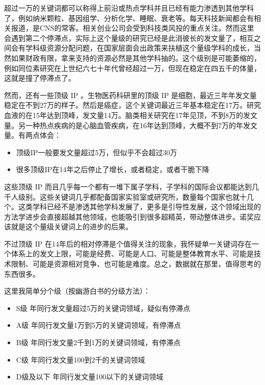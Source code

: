 \documentclass[]{tufte-book}
\providecommand{\tightlist}{%
  \setlength{\itemsep}{0pt}\setlength{\parskip}{0pt}}
\begin{document}
超过一万的关键词都可以称得上前沿或热点学科并且已经有能力渗透到其他学科了，例如纳米颗粒、基因组学、分析化学、睡眠、衰老等。每天科技新闻都会有相关报道，是CNS的常客。相关创业公司会受到科技类风投的重点关注。然而这里会遇到第二个停滞点，实际上这个量级的研究已经是此消彼长的发文量了，相互之间会有学科级资源分配问题，在国家层面会出政策来扶植这个量级学科的成长，当然如果财政有限，拿来支持的资源必然是其他学科抽的。这个级别是可能萎缩的，例如同位素研究在上世纪六七十年代曾经超过一万，但现在稳定在四五千的体量，这就是撞了停滞点了。

然而，还有一些顶级 IP 。生物医药科研里的顶级 IP 是细胞，最近三年年发文量稳定在不到27万的样子。然后是癌症，这个关键词最近三年基本稳定在17万。研究血液的在15年达到顶峰，发文量14万。脑类相关研究在17年见顶，不到8万的发文量。另一种热点疾病的是心脑血管疾病，在16年达到顶峰，大概不到7万的年发文量。有两点体会：

\begin{itemize}
\tightlist
\item
  顶级IP一般要发文量超过5万，但似乎不会超过30万
\item
  很多顶级IP在14年之后停止了增长，或者稳定，或者干脆下降
\end{itemize}

这些顶级 IP 而且几乎每一个都有一堆下属子学科，子学科的国际会议都能达到几千人级别。这些关键词几乎都配备国家实验室或研究所，数量每个国家也就十几个。这类学科已经不是渗透其他学科发展了，更多是引导性发展，这个领域出现的方法学进步会直接超越其他领域，也能吸引到很多超精英，带动整体进步。诺奖应该就是这个量级关键词上的进步的后果。

不过顶级 IP 在14年后的相对停滞是个值得关注的现象，我怀疑单一关键词存在一个体系上的发文上限，可能是经费、可能是人口、可能是整体教育水平、可能是技术限制、可能是资源相对竞争、也可能是难度。总之，数据就在那里，值得思考的东西很多。

这里我简单分个级（按幽游白书的分级方法）：

\begin{itemize}
\tightlist
\item
  S级 年同行发文量超过5万的关键词领域，疑似有停滞点
\item
  A级 年同行发文量1万到5万的关键词领域，有停滞点
\item
  B级 年同行发文量2千到1万的关键词领域，有停滞点
\item
  C级 年同行发文量100到2千的关键词领域
\item
  D级及以下 年同行发文量100以下的关键词领域
\end{itemize}
\end{document}
